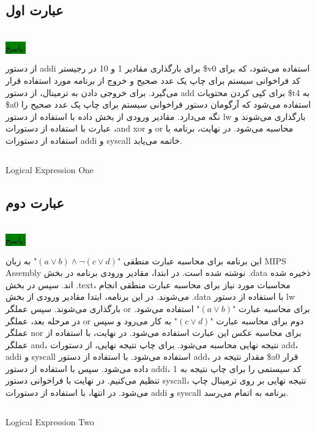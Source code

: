 \subsection{عبارت اول}
\\
\colorbox{green}{پاسخ:}
\normalfont

{از دستور addi برای بارگذاری مقادیر 1 و 10 در رجیستر \$v0 استفاده می‌شود، که برای کد فراخوانی سیستم برای چاپ یک عدد صحیح و خروج از برنامه مورد استفاده قرار می‌گیرد. برای خروجی دادن به ترمینال، از دستور add برای کپی کردن محتویات \$t4 به \$a0 استفاده می‌شود که آرگومان دستور فراخوانی سیستم برای چاپ یک عدد صحیح را نگه می‌دارد. مقادیر ورودی از بخش داده با استفاده از دستور lw بارگذاری می‌شوند و عبارت با استفاده از دستورات ،and xor و or محاسبه می‌شود. در نهایت، برنامه با استفاده از دستورات addi و syscall خاتمه می‌یابد.}
\begin{latin}
\begin{listing}[H]
    \inputminted[linenos=true]{asm}{sources/Logical_Expression_One.mips}
    \caption{Logical Expression One}
    \label{Logical-Expression-One}
\end{listing}
\end{latin}

\subsection{عبارت دوم}
\\
\colorbox{green}{پاسخ:}
\normalfont

{این برنامه برای محاسبه عبارت منطقی "$(a \lor b) \land \lnot(c \lor d)$" به زبان MIPS Assembly نوشته شده است. در ابتدا، مقادیر ورودی برنامه در بخش .data ذخیره شده اند. سپس در بخش .text، محاسبات مورد نیاز برای محاسبه عبارت منطقی انجام می‌شوند. در این برنامه، ابتدا مقادیر ورودی از بخش .data با استفاده از دستور lw بارگذاری می‌شوند. سپس عملگر or برای محاسبه عبارت "$(a \lor b)$" استفاده می‌شود. در مرحله بعد، عملگر or دوم برای محاسبه عبارت "$(c \lor d)$" به کار می‌رود و سپس عملگر nor برای محاسبه عکس این عبارت استفاده می‌شود. در نهایت، با استفاده از عملگر and، نتیجه نهایی محاسبه می‌شود. برای چاپ نتیجه نهایی، از دستورات add، addi و syscall استفاده می‌شود. با استفاده از دستور add، مقدار نتیجه در \$a0 قرار داده می‌شود. سپس با استفاده از دستور addi، کد سیستمی را برای چاپ نتیجه به 1 تنظیم می‌کنیم. در نهایت با فراخوانی دستور syscall، نتیجه نهایی بر روی ترمینال چاپ می‌شود. در انتها، با استفاده از دستورات addi و syscall برنامه به اتمام می‌رسد.}
\begin{latin}
\begin{listing}[H]
    \inputminted[linenos=true]{asm}{sources/Logical_Expression_Two.mips}
    \caption{Logical Expression Two}
    \label{Logical-Expression-Two}
\end{listing}
\end{latin}

